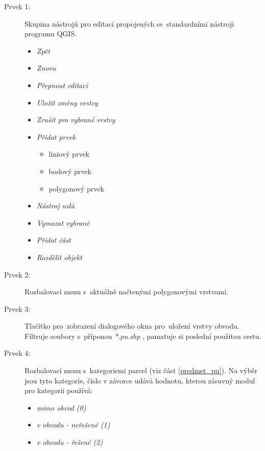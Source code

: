\begin{description}
	\item[Prvek 1:] Skupina nástrojů pro editaci propojených se~standardními nástroji programu QGIS.
	\begin{itemize}[leftmargin=1.5cm, noitemsep]
		\item {} \textit{Zpět}
		\item {} \textit{Znovu}
		\item {} \textit{Přepnout editaci}
		\item {} \textit{Uložit změny vrstvy}
		\item {} \textit{Zrušit pro vybrané vrstvy}
		\item \textit{Přidat prvek}
		\begin{itemize}[leftmargin=1.5cm, noitemsep]
			\item {} liniový prvek
			\item {} bodový prvek
			\item {} polygonový prvek
 		\end{itemize}
		\item {} \textit{Nástroj uzlů}
		\item {} \textit{Vymazat vybrané}
		\item {} \textit{Přidat část}
		\item {} \textit{Rozdělit objekt}
 	\end{itemize}
	\item[Prvek 2:] Rozbalovací menu s~aktuálně načtenými polygonovými vrstvami.
	\item[Prvek 3:] Tlačítko pro~zobrazení dialogového okna pro~uložení vrstvy obvodu. Filtruje soubory s~příponou \textit{*.pu.shp} , pamatuje si poslední použitou cestu.
	\item[Prvek 4:] Rozbalovací menu s~kategoriemi parcel (viz část \ref{predmet_pu}). Na výběr jsou tyto kategorie, číslo v závorce udává hodnotu, kterou zásuvný modul pro kategorii používá:
	\begin{itemize}[leftmargin=1.5cm, noitemsep]
		\item \textit{mimo obvod (0)}
		\item \textit{v obvodu - neřešené (1)}
		\item \textit{v obvodu - řešené (2)}

\end{itemize}
\end{description}
